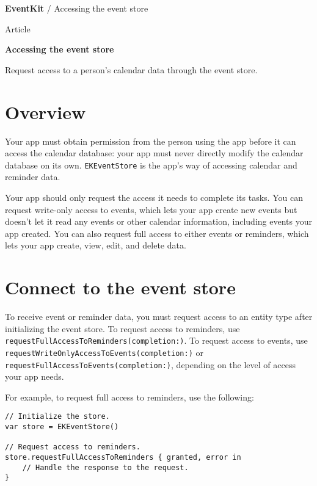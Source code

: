 \documentclass{article}
\title{}
\author{}
\date{}
\begin{document}
\textbf{EventKit} / Accessing the event store

Article

\textbf{Accessing the event store}

Request access to a person's calendar data through the event store.

\section*{Overview}

Your app must obtain permission from the person using the app before it can access the calendar database: your app must never directly modify the calendar database on its own. \texttt{EKEventStore} is the app's way of accessing calendar and reminder data.

Your app should only request the access it needs to complete its tasks. You can request write-only access to events, which lets your app create new events but doesn't let it read any events or other calendar information, including events your app created. You can also request full access to either events or reminders, which lets your app create, view, edit, and delete data.

\noindent{}

\section*{Connect to the event store}

To receive event or reminder data, you must request access to an entity type after initializing the event store. To request access to reminders, use \texttt{requestFullAccessToReminders(completion:)}. To request access to events, use \texttt{requestWriteOnlyAccessToEvents(completion:)} or \texttt{requestFullAccessToEvents(completion:)}, depending on the level of access your app needs.

For example, to request full access to reminders, use the following:

\begin{verbatim}
// Initialize the store.
var store = EKEventStore()

// Request access to reminders.
store.requestFullAccessToReminders { granted, error in
    // Handle the response to the request.
}
\end{verbatim}
\end{document}
